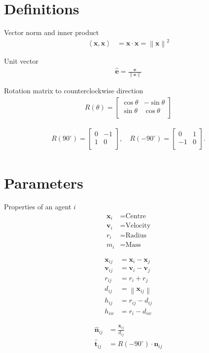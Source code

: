 \section{Definitions}

Vector norm and inner product
\begin{align}
\left\langle \mathbf{x}, \mathbf{x} \right\rangle &= \mathbf{x} \cdot \mathbf{x} = \left\| \mathbf{x}\right\|^{2}
\end{align}

Unit vector
\begin{align}
\hat{\mathbf{e}} = \frac{\mathbf{e}}{\left\|\mathbf{e}\right\|}
\end{align}

Rotation matrix to counterclockwise direction
\begin{align}
R(\theta) = \begin{bmatrix}\cos \theta & -\sin \theta \\\sin \theta & \cos \theta \\\end{bmatrix}
\end{align}

\begin{align}
R(90^{\circ}) = \begin{bmatrix}0 & -1 \\ 1 & 0 \\\end{bmatrix}, \quad R(-90^{\circ}) = \begin{bmatrix}0 & 1 \\ -1 & 0 \\\end{bmatrix}. \\
\end{align}



\section{Parameters}

Properties of an agent $ i $
\begin{align}
\mathbf{x}_{i} &= \text{Centre} \\
\mathbf{v}_{i} &= \text{Velocity} \\
r_{i} &= \text{Radius} \\
m_{i} &= \text{Mass}
\end{align}

\begin{align}
\mathbf{x}_{ij} &= \mathbf{x}_{i} - \mathbf{x}_{j} \\
\mathbf{v}_{ij} &= \mathbf{v}_{i} - \mathbf{v}_{j} \\
r_{ij} &= r_{i} + r_{j} \\
d_{ij} &= \left\|\mathbf{x}_{ij}\right\| \\
h_{ij} &= r_{ij} - d_{ij} \\
h_{iw} &= r_{i} - d_{iw}
\end{align}

\begin{align}
\hat{\mathbf{n}}_{ij} &= \frac{\mathbf{x}_{ij}}{d_{ij}} \\
\hat{\mathbf{t}}_{ij} &= R(-90^{\circ}) \cdot \mathbf{n}_{ij}
\end{align}


